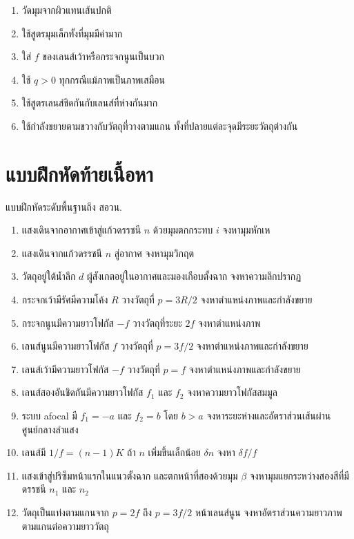 \begin{tcolorbox}[title={ข้อผิดพลาดที่พบบ่อย}]
\begin{enumerate}
    \item วัดมุมจากผิวแทนเส้นปกติ
    \item ใช้สูตรมุมเล็กทั้งที่มุมมีค่ามาก
    \item ใส่ $f$ ของเลนส์เว้าหรือกระจกนูนเป็นบวก
    \item ใช้ $q>0$ ทุกกรณีแม้ภาพเป็นภาพเสมือน
    \item ใช้สูตรเลนส์ชิดกันกับเลนส์ที่ห่างกันมาก
    \item ใช้กำลังขยายตามขวางกับวัตถุที่วางตามแกน ทั้งที่ปลายแต่ละจุดมีระยะวัตถุต่างกัน
\end{enumerate}
\end{tcolorbox}

\section{แบบฝึกหัดท้ายเนื้อหา}

\begin{exercisebox}{แบบฝึกหัดระดับพื้นฐานถึง สอวน.}
\begin{enumerate}
    \item แสงเดินจากอากาศเข้าสู่แก้วดรรชนี $n$ ด้วยมุมตกกระทบ $i$ จงหามุมหักเห
    \item แสงเดินจากแก้วดรรชนี $n$ สู่อากาศ จงหามุมวิกฤต
    \item วัตถุอยู่ใต้น้ำลึก $d$ ผู้สังเกตอยู่ในอากาศและมองเกือบตั้งฉาก จงหาความลึกปรากฏ
    \item กระจกเว้ามีรัศมีความโค้ง $R$ วางวัตถุที่ $p=3R/2$ จงหาตำแหน่งภาพและกำลังขยาย
    \item กระจกนูนมีความยาวโฟกัส $-f$ วางวัตถุที่ระยะ $2f$ จงหาตำแหน่งภาพ
    \item เลนส์นูนมีความยาวโฟกัส $f$ วางวัตถุที่ $p=3f/2$ จงหาตำแหน่งภาพและกำลังขยาย
    \item เลนส์เว้ามีความยาวโฟกัส $-f$ วางวัตถุที่ $p=f$ จงหาตำแหน่งภาพและกำลังขยาย
    \item เลนส์สองอันชิดกันมีความยาวโฟกัส $f_1$ และ $f_2$ จงหาความยาวโฟกัสสมมูล
    \item ระบบ afocal มี $f_1=-a$ และ $f_2=b$ โดย $b>a$ จงหาระยะห่างและอัตราส่วนเส้นผ่านศูนย์กลางลำแสง
    \item เลนส์มี $1/f=(n-1)K$ ถ้า $n$ เพิ่มขึ้นเล็กน้อย $\delta n$ จงหา $\delta f/f$
    \item แสงเข้าสู่ปริซึมหน้าแรกในแนวตั้งฉาก และตกหน้าที่สองด้วยมุม $\beta$ จงหามุมแยกระหว่างสองสีที่มีดรรชนี $n_1$ และ $n_2$
    \item วัตถุเป็นแท่งตามแกนจาก $p=2f$ ถึง $p=3f/2$ หน้าเลนส์นูน จงหาอัตราส่วนความยาวภาพตามแกนต่อความยาววัตถุ
\end{enumerate}
\end{exercisebox}

